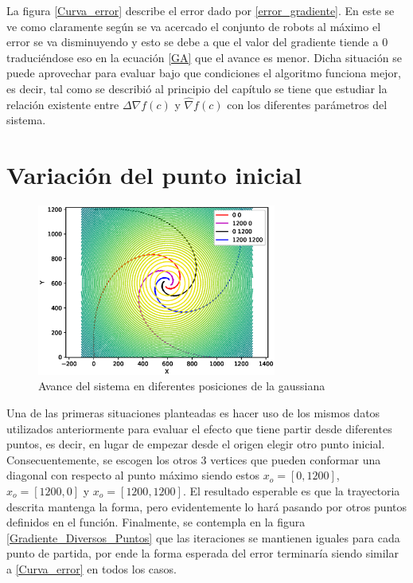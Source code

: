 La figura \ref{Curva_error} describe el error dado por \ref{error_gradiente}. En este se ve como claramente según se va acercado el conjunto de robots al máximo el error se va disminuyendo y esto se debe a que el valor del gradiente tiende a 0 traduciéndose eso en la ecuación \ref{GA} que el avance es menor. Dicha situación se puede aprovechar para evaluar bajo que condiciones el algoritmo funciona mejor, es decir, tal como se describió al principio del capítulo se tiene que estudiar la relación existente entre $\Delta{\nabla{f\left(c\right)}}$ y $\hat{\nabla}{f\left(c\right)}$ con los diferentes parámetros del sistema.

\section{Variación del punto inicial}

\begin{figure}[H]
\centering
\includegraphics[width=0.70\textwidth]{figures/4_puntos_observar_forma/Figure_1.eps}
\caption{Avance del sistema en diferentes posiciones de la gaussiana} \label{Avance_Posicion}
\end{figure}

Una de las primeras situaciones planteadas es hacer uso de los mismos datos utilizados anteriormente para evaluar el efecto que tiene partir desde diferentes puntos, es decir, en lugar de empezar desde el origen elegir otro punto inicial. Consecuentemente, se escogen los otros 3 vertices que pueden conformar una diagonal con respecto al punto máximo siendo estos $x_o=[0,1200]$, $x_o=[1200,0]$ y $x_o=[1200,1200]$. El resultado esperable es que la trayectoria descrita mantenga la forma, pero evidentemente lo hará pasando por otros puntos definidos en el función. Finalmente, se contempla en la figura \ref{Gradiente_Diversos_Puntos} que las iteraciones se mantienen iguales para cada punto de partida, por ende la forma esperada del error terminaría siendo similar a \ref{Curva_error} en todos los casos. 

